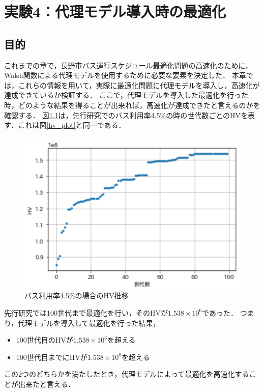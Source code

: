 \documentclass[main]{subfiles}
\begin{document}
\chapter{実験4：代理モデル導入時の最適化}
    \section{目的}
    これまでの章で，長野市バス運行スケジュール最適化問題の高速化のために，
    Walsh関数による代理モデルを使用するために必要な要素を決定した．
    本章では，これらの情報を用いて，実際に最適化問題に代理モデルを導入し，高速化が達成できているか検証する．
    ここで，代理モデルを導入した最適化を行った時，どのような結果を得ることが出来れば，高速化が達成できたと言えるのかを確認する．
    図\ref{hv_plot_}は，先行研究でのバス利用率4.5\%の時の世代数ごとのHVを表す．これは図\ref{hv_plot}と同一である．
    
    \begin{figure}
        \centering
        \includegraphics[width=\linewidth]{figures/hv_plot.png}
        \caption{バス利用率4.5\%の場合のHV推移}
        \label{hv_plot_}
    \end{figure}
    先行研究では100世代まで最適化を行い，そのHVが$1.538\times 10^6$であった．
    つまり，代理モデルを導入して最適化を行った結果，
    \begin{itemize}
        \item 100世代目のHVが$1.538\times 10^6$を超える
        \item 100世代目までにHVが$1.538\times 10^6$を超える
    \end{itemize}
    この2つのどちらかを満たしたとき，代理モデルによって最適化を高速化することが出来たと言える．
    
\end{document}
